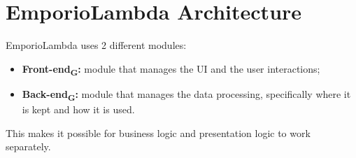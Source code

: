 \section{EmporioLambda Architecture}
EmporioLambda uses 2 different modules:
\begin{itemize}
\item \textbf{Front-end\textsubscript{G}:} module that manages the UI and the user interactions;
\item \textbf{Back-end\textsubscript{G}:} module that manages the data processing, specifically where it is kept and how it is used.
\end{itemize}
This makes it possible for business logic and presentation logic to work separately.


\newpage

\newpage

\newpage

\newpage

\newpage